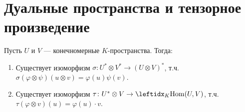 \section{Дуальные пространства и тензорное произведение}

\begin{thm*}
    Пусть $U$ и $V$ --- конечномерные $K$-пространства. Тогда:
    \begin{enumerate}
        \item Существует изоморфизм $\sigma \colon U^* \otimes V^* \to (U \otimes V)^*$, т.ч. $\sigma(\varphi \otimes \psi)(u \otimes v) = \varphi(u) \psi(v)$.
        \item Существует изоморфизм $\tau \colon U^* \otimes V \to \lsub{K}{\hom(U, V)}$, т.ч. $\tau(\varphi \otimes v)(u) = \varphi(u) \cdot v$.
    \end{enumerate}
\end{thm*}

